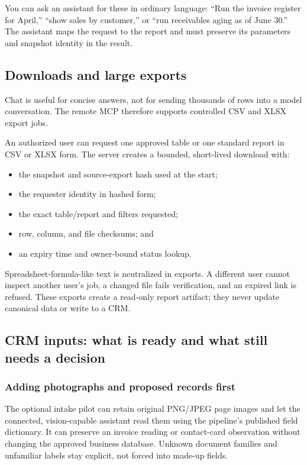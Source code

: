 \documentclass[
]{article}
\providecommand{\tightlist}{%
  \setlength{\itemsep}{0pt}\setlength{\parskip}{0pt}}
\begin{document}
You can ask an assistant for these in ordinary language: ``Run the
invoice register for April,'' ``show sales by customer,'' or ``run
receivables aging as of June 30.'' The assistant maps the request to the
report and must preserve its parameters and snapshot identity in the
result.

\subsection{Downloads and large
exports}\label{downloads-and-large-exports}

Chat is useful for concise answers, not for sending thousands of rows
into a model conversation. The remote MCP therefore supports controlled
CSV and XLSX export jobs.

An authorized user can request one approved table or one standard report
in CSV or XLSX form. The server creates a bounded, short-lived download
with:

\begin{itemize}
\tightlist
\item
  the snapshot and source-export hash used at the start;
\item
  the requester identity in hashed form;
\item
  the exact table/report and filters requested;
\item
  row, column, and file checksums; and
\item
  an expiry time and owner-bound status lookup.
\end{itemize}

Spreadsheet-formula-like text is neutralized in exports. A different
user cannot inspect another user's job, a changed file fails
verification, and an expired link is refused. These exports create a
read-only report artifact; they never update canonical data or write to
a CRM.

\subsection{CRM inputs: what is ready and what still needs a
decision}\label{crm-inputs-what-is-ready-and-what-still-needs-a-decision}

\subsubsection{Adding photographs and proposed records
first}\label{adding-photographs-and-proposed-records-first}

The optional intake pilot can retain original PNG/JPEG page images and
let the connected, vision-capable assistant read them using the
pipeline's published field dictionary. It can preserve an invoice
reading or contact-card observation without changing the approved
business database. Unknown document families and unfamiliar labels stay
explicit, not forced into made-up fields.
\end{document}
